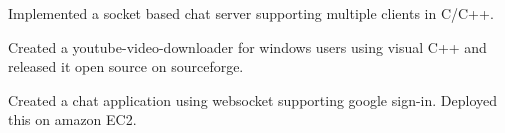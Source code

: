 



\begin{cventries}

\cvproject
{
    \begin{cvitems} %
        \item {Implemented a socket based chat server supporting multiple clients in C/C++.}
        \item {Created a youtube-video-downloader for windows users using visual C++ and released it open source on sourceforge.}
        \item {Created a chat application using websocket supporting google sign-in. Deployed this on amazon EC2.}
        \end{cvitems}
}

\end{cventries}

